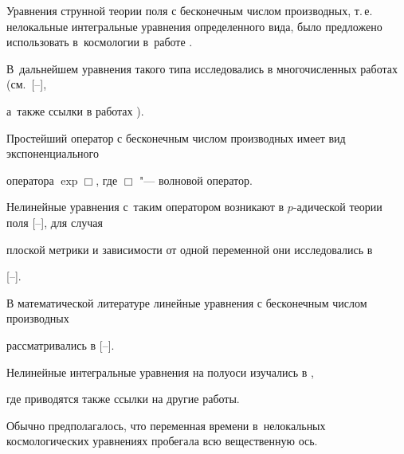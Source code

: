 \date{22/III/2011} %











\maketitle








Уравнения струнной теории поля с бесконечным числом производных, т.\,е. нелокальные интегральные уравнения определенного вида, было предложено использовать в~космологии в~работе \cite{IA04}.  

В~дальнейшем уравнения такого типа исследовались в многочисленных работах (см.~[--],

а~также ссылки в работах \cite{IA:2011, IAIV:2011}).

Простейший оператор с бесконечным числом производных имеет вид экспоненциального

оператора $\exp {\Box}$, где $\Box$ "--- волновой оператор. 

Нелинейные уравнения с~таким оператором возникают в $p$-адической теории поля [--], для случая

плоской метрики и зависимости от одной переменной они исследовались в 


[--].



В математической литературе линейные уравнения с бесконечным числом производных

рассматривались в [--]. 

Нелинейные интегральные уравнения на полуоси изучались в \cite{AE, Khach},

где приводятся также ссылки на другие работы.



Обычно предполагалось, что переменная времени в~нелокальных космологических  уравнениях пробегала всю вещественную ось.

